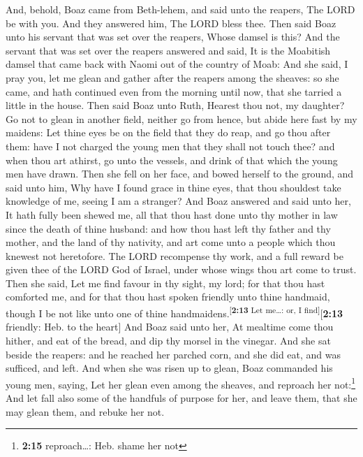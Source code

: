  And, behold, Boaz came from Beth-lehem, and said unto the
reapers, The LORD be with you. And they answered him, The LORD bless
thee.  Then said Boaz unto his servant that was set over
the reapers, Whose damsel is this?  And the servant that
was set over the reapers answered and said, It is the Moabitish damsel
that came back with Naomi out of the country of Moab:  And
she said, I pray you, let me glean and gather after the reapers among
the sheaves: so she came, and hath continued even from the morning until
now, that she tarried a little in the house.  Then said
Boaz unto Ruth, Hearest thou not, my daughter? Go not to glean in
another field, neither go from hence, but abide here fast by my maidens:
 Let thine eyes be on the field that they do reap, and go
thou after them: have I not charged the young men that they shall not
touch thee? and when thou art athirst, go unto the vessels, and drink of
that which the young men have drawn.  Then she fell on
her face, and bowed herself to the ground, and said unto him, Why have I
found grace in thine eyes, that thou shouldest take knowledge of me,
seeing I am a stranger?  And Boaz answered and said unto
her, It hath fully been shewed me, all that thou hast done unto thy
mother in law since the death of thine husband: and how thou hast left
thy father and thy mother, and the land of thy nativity, and art come
unto a people which thou knewest not heretofore.  The
LORD recompense thy work, and a full reward be given thee of the LORD
God of Israel, under whose wings thou art come to trust. 
Then she said, Let me find favour in thy sight, my lord; for that thou
hast comforted me, and for that thou hast spoken friendly unto thine
handmaid, though I be not like unto one of thine
handmaidens.\textsuperscript{{[}\textbf{2:13} Let me\ldots: or, I
find{]}}{[}\textbf{2:13} friendly: Heb. to the heart{]} 
And Boaz said unto her, At mealtime come thou hither, and eat of the
bread, and dip thy morsel in the vinegar. And she sat beside the
reapers: and he reached her parched corn, and she did eat, and was
sufficed, and left.  And when she was risen up to glean,
Boaz commanded his young men, saying, Let her glean even among the
sheaves, and reproach her not:\footnote{\textbf{2:15} reproach\ldots:
  Heb. shame her not}  And let fall also some of the
handfuls of purpose for her, and leave them, that she may glean them,
and rebuke her not.

